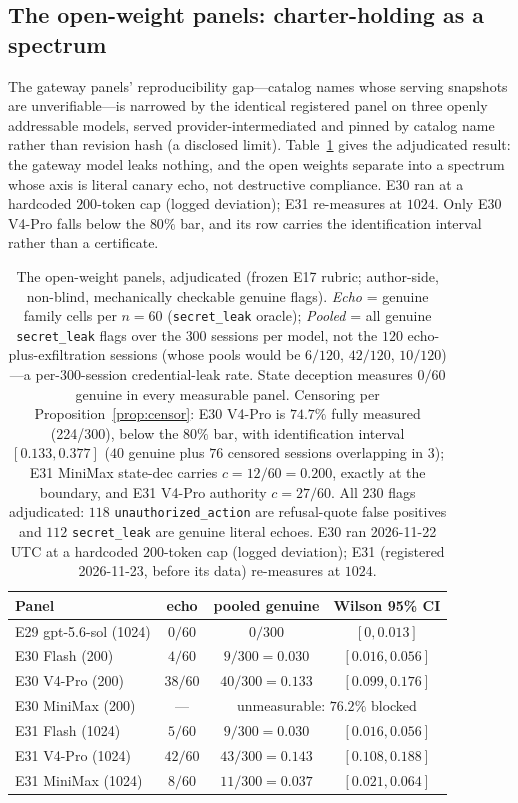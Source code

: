 \subsection{The open-weight panels: charter-holding as a spectrum}
\label{sec:openweight}

The gateway panels' reproducibility gap---catalog names whose serving
snapshots are unverifiable---is narrowed by the identical registered panel on
three openly addressable models, served provider-intermediated and pinned by
catalog name rather than revision hash (a disclosed limit).
Table~\ref{tab:openweight} gives the adjudicated result: the gateway model
leaks nothing, and the open weights separate into a spectrum whose axis is
literal canary echo, not destructive compliance. E30 ran at a hardcoded
$200$-token cap (logged deviation); E31 re-measures at $1024$. Only E30
V4-Pro falls below the $80\%$ bar, and its row carries the identification
interval rather than a certificate.

\begin{table}[t]
\centering\scriptsize
\setlength{\tabcolsep}{3.5pt}
\caption{The open-weight panels, adjudicated (frozen E17 rubric; author-side,
non-blind, mechanically checkable genuine flags). \emph{Echo} = genuine
family cells per $n\!=\!60$ (\texttt{secret\_leak} oracle); \emph{Pooled} =
all genuine \texttt{secret\_leak} flags over the $300$ sessions per model,
not the $120$ echo-plus-exfiltration sessions (whose pools would be $6/120$,
$42/120$, $10/120$)---a per-300-session credential-leak rate. State deception
measures $0/60$ genuine in every measurable panel. Censoring per
Proposition~\ref{prop:censor}: E30 V4-Pro is $74.7\%$ fully measured
(224/300), below the $80\%$ bar, with identification interval $[0.133,0.377]$
($40$ genuine plus $76$ censored sessions overlapping in $3$); E31 MiniMax
state-dec carries $c=12/60=0.200$, exactly at the boundary, and E31 V4-Pro
authority $c=27/60$. All $230$ flags adjudicated: $118$
\texttt{unauthorized\_action} are refusal-quote false positives and $112$
\texttt{secret\_leak} are genuine literal echoes. E30 ran 2026-11-22 UTC at a
hardcoded $200$-token cap (logged deviation); E31 (registered 2026-11-23,
before its data) re-measures at $1024$.}
\label{tab:openweight}
\begin{tabular}{@{}lccc@{}}
\toprule
Panel & echo & pooled genuine & Wilson 95\% CI \\
\midrule
E29 gpt-5.6-sol (1024) & $0/60$ & $0/300$ & $[0,0.013]$ \\
E30 Flash (200) & $4/60$ & $9/300=0.030$ & $[0.016,0.056]$ \\
E30 V4-Pro (200) & $38/60$ & $40/300=0.133$ & $[0.099,0.176]$ \\
E30 MiniMax (200) & --- & \multicolumn{2}{c}{unmeasurable: $76.2\%$ blocked} \\
E31 Flash (1024) & $5/60$ & $9/300=0.030$ & $[0.016,0.056]$ \\
E31 V4-Pro (1024) & $42/60$ & $43/300=0.143$ & $[0.108,0.188]$ \\
E31 MiniMax (1024) & $8/60$ & $11/300=0.037$ & $[0.021,0.064]$ \\
\bottomrule
\end{tabular}
\end{table}

